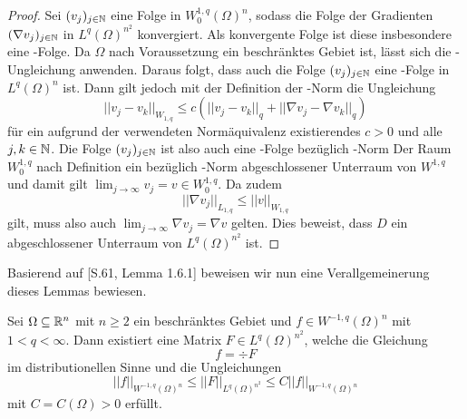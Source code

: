 \begin{proof}
  Sei $(v_j)_{j \in \mathbb{N}}$ eine Folge in $W_0^{1,q}(\Omega)^n$, sodass die Folge der Gradienten $(\nabla v_j)_{j \in \mathbb{N}}$ in $L^q(\Omega)^{n^2}$ konvergiert.
  Als konvergente Folge ist diese insbesondere eine \cauchy\hyp{}Folge.
  Da $\Omega$ nach Voraussetzung ein beschränktes Gebiet ist, lässt sich die \poincare\hyp{}Ungleichung anwenden.
  Daraus folgt, dass auch die Folge $(v_j)_{j \in \mathbb{N}}$ eine \cauchy\hyp{}Folge in $L^q(\Omega)^n$ ist.
  Dann gilt jedoch mit der Definition der \sobolev\hyp{}Norm die Ungleichung
  $$
  ||v_j - v_k||_{W_{1,q}} \leq c (||v_j - v_k||_q + ||\nabla v_j - \nabla v_k||_q)
  $$
  für ein aufgrund der verwendeten Normäquivalenz existierendes $c > 0$ und alle $j,k \in \mathbb{N}$.
  Die Folge $(v_j)_{j \in \mathbb{N}}$ ist also auch eine \cauchy\hyp{}Folge bezüglich \sobolev\hyp{}Norm
  Der Raum $W_0^{1,q}$ nach Definition ein bezüglich \sobolev\hyp{}Norm abgeschlossener Unterraum von $W^{1,q}$ und damit gilt $\lim_{j \to \infty} v_j = v \in W_0^{1,q}$.
  Da zudem
  $$
  ||\nabla v_j||_{L_{1,q}} \leq ||v||_{W_{1,q}}  
  $$
  gilt, muss also auch $\lim_{j \to \infty} \nabla v_j = \nabla v$ gelten.
  Dies beweist, dass $D$ ein abgeschlossener Unterraum von $L^q(\Omega)^{n^2}$ ist.
\end{proof}

Basierend auf \cite{sohr2001navier}[S.61, Lemma 1.6.1] beweisen wir nun eine Verallgemeinerung dieses Lemmas bewiesen. 

\begin{lem}
  \label{lem:divRepresentation}
  Sei $\Omega \subseteq \mathbb{R}^n$ mit $n \geq 2$ ein beschränktes Gebiet und $f \in W^{-1,q}(\Omega)^n$ mit $1 < q < \infty$.
  Dann existiert eine Matrix $F \in L^q(\Omega)^{n^2}$, welche die Gleichung
  $$ f = \div F $$
  im distributionellen Sinne und die Ungleichungen
  $$
  || f ||_{W^{-1,q}(\Omega)^n} 
  \leq || F ||_{L^q(\Omega)^{n^2}} 
  \leq C || f ||_{W^{-1,q}(\Omega)^n}
  $$
  mit $C = C(\Omega) > 0$ erfüllt.
\end{lem}

